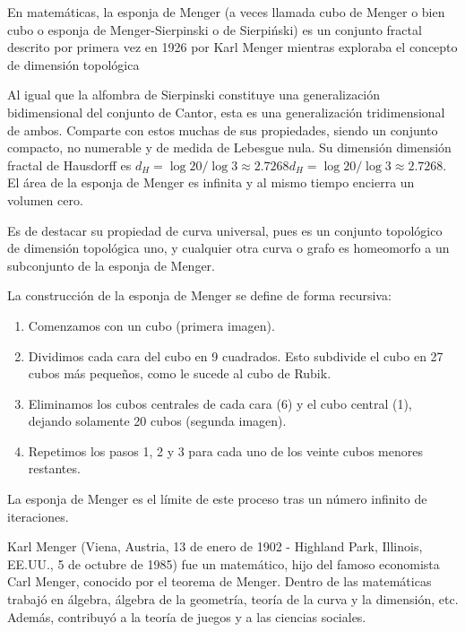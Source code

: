 En matemáticas, la esponja de Menger (a veces llamada cubo de Menger o bien cubo o esponja de Menger-Sierpinski o de Sierpiński) es un conjunto fractal descrito por primera vez en 1926 por Karl Menger mientras exploraba el concepto de dimensión topológica

Al igual que la alfombra de Sierpinski constituye una generalización bidimensional del conjunto de Cantor, esta es una generalización tridimensional de ambos. Comparte con estos muchas de sus propiedades, siendo un conjunto compacto, no numerable y de medida de Lebesgue nula. Su dimensión dimensión fractal de Hausdorff es ${ d_{H}=\log 20/\log 3\approx 2.7268}d_{H}=\log 20/\log 3\approx 2.7268$. El área de la esponja de Menger es infinita y al mismo tiempo encierra un volumen cero.




Es de destacar su propiedad de curva universal, pues es un conjunto topológico de dimensión topológica uno, y cualquier otra curva o grafo es homeomorfo a un subconjunto de la esponja de Menger.


La construcción de la esponja de Menger se define de forma recursiva:

\begin{enumerate}
	\item Comenzamos con un cubo (primera imagen).
	\item Dividimos cada cara del cubo en 9 cuadrados. Esto subdivide el cubo en 27 cubos más pequeños, como le sucede al cubo de Rubik.
	\item Eliminamos los cubos centrales de cada cara (6) y el cubo central (1), dejando solamente 20 cubos (segunda imagen).
	\item Repetimos los pasos 1, 2 y 3 para cada uno de los veinte cubos menores restantes.
\end{enumerate}
La esponja de Menger es el límite de este proceso tras un número infinito de iteraciones.


Karl Menger (Viena, Austria, 13 de enero de 1902 - Highland Park, Illinois, EE.UU., 5 de octubre de 1985) fue un matemático, hijo del famoso economista Carl Menger, conocido por el teorema de Menger. Dentro de las matemáticas trabajó en álgebra, álgebra de la geometría, teoría de la curva y la dimensión, etc. Además, contribuyó a la teoría de juegos y a las ciencias sociales.
